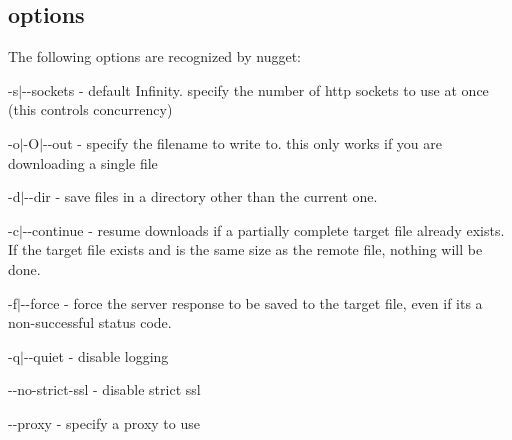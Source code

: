 \subsection*{options}

The following options are recognized by nugget\+:


\begin{DoxyItemize}
\item {\ttfamily -\/s$\vert$-\/-\/sockets} -\/ default Infinity. specify the number of http sockets to use at once (this controls concurrency)
\item {\ttfamily -\/o$\vert$-\/\+O$\vert$-\/-\/out} -\/ specify the filename to write to. this only works if you are downloading a single file
\item {\ttfamily -\/d$\vert$-\/-\/dir} -\/ save files in a directory other than the current one.
\item {\ttfamily -\/c$\vert$-\/-\/continue} -\/ resume downloads if a partially complete target file already exists. If the target file exists and is the same size as the remote file, nothing will be done.
\item {\ttfamily -\/f$\vert$-\/-\/force} -\/ force the server response to be saved to the target file, even if it\textquotesingle{}s a non-\/successful status code.
\item {\ttfamily -\/q$\vert$-\/-\/quiet} -\/ disable logging
\item {\ttfamily -\/-\/no-\/strict-\/ssl} -\/ disable strict ssl
\item {\ttfamily -\/-\/proxy} -\/ specify a proxy to use 
\end{DoxyItemize}